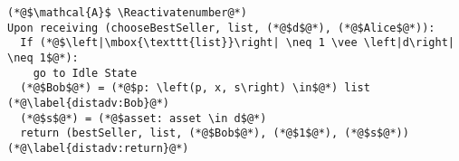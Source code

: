 \Suppressnumber
\begin{lstlisting}[label=distadv, style=numbers]
(*@$\mathcal{A}$ \Reactivatenumber@*)
Upon receiving (chooseBestSeller, list, (*@$d$@*), (*@$Alice$@*)):
  If (*@$\left|\mbox{\texttt{list}}\right| \neq 1 \vee \left|d\right| \neq 1$@*):
    go to Idle State
  (*@$Bob$@*) = (*@$p: \left(p, x, s\right) \in$@*) list (*@\label{distadv:Bob}@*)
  (*@$s$@*) = (*@$asset: asset \in d$@*)
  return (bestSeller, list, (*@$Bob$@*), (*@$1$@*), (*@$s$@*)) (*@\label{distadv:return}@*)
\end{lstlisting}
